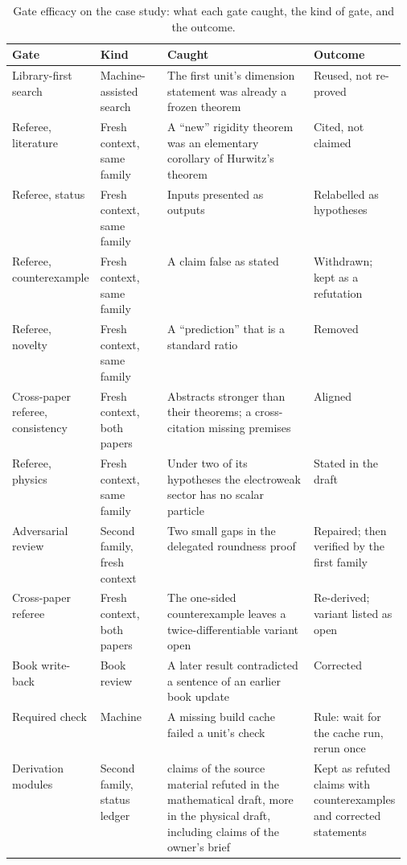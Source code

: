 \documentclass[11pt]{article}
\begin{document}
\begin{table}[htbp]
\centering\scriptsize
\caption{Gate efficacy on the case study: what each gate caught, the kind of
gate, and the outcome.}
\label{tab:caught}
\begin{tabularx}{\linewidth}{@{}>{\raggedright\arraybackslash}p{0.2\linewidth}>{\raggedright\arraybackslash}p{0.17\linewidth}>{\raggedright\arraybackslash}X>{\raggedright\arraybackslash}p{0.2\linewidth}@{}}
\toprule
Gate & Kind & Caught & Outcome \\
\midrule
Library-first search & Machine-assisted search & The first unit's dimension statement was already a frozen theorem & Reused, not re-proved \\
Referee, literature & Fresh context, same family & A ``new'' rigidity theorem was an elementary corollary of Hurwitz's theorem & Cited, not claimed \\
Referee, status & Fresh context, same family & Inputs presented as outputs & Relabelled as hypotheses \\
Referee, counterexample & Fresh context, same family & A claim false as stated & Withdrawn; kept as a refutation \\
Referee, novelty & Fresh context, same family & A ``prediction'' that is a standard ratio & Removed \\
Cross-paper referee, consistency & Fresh context, both papers & Abstracts stronger than their theorems; a cross-citation missing premises & Aligned \\
Referee, physics & Fresh context, same family & Under two of its hypotheses the electroweak sector has no scalar particle & Stated in the draft \\
Adversarial review & Second family, fresh context & Two small gaps in the delegated roundness proof & Repaired; then verified by the first family \\
Cross-paper referee & Fresh context, both papers & The one-sided counterexample leaves a twice-differentiable variant open & Re-derived; variant listed as open \\
Book write-back & Book review & A later result contradicted a sentence of an earlier book update & Corrected \\
Required check & Machine & A missing build cache failed a unit's check & Rule: wait for the cache run, rerun once \\
Derivation modules & Second family, status ledger & 52 claims of the source material refuted in the mathematical draft, more in the physical draft, including claims of the owner's brief & Kept as refuted claims with counterexamples and corrected statements \\

\end{tabularx}
\end{table}
\end{document}
